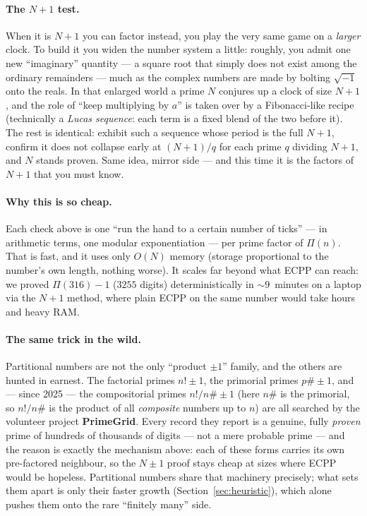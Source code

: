 \documentclass[11pt,a4paper]{article}
\newcommand{\Part}{\Pi}                 %
\begin{document}
\paragraph{The $N+1$ test.}
When it is $N+1$ you can factor instead, you play the very same game on a
\emph{larger} clock. To build it you widen the number system a little: roughly,
you admit one new ``imaginary'' quantity --- a square root that simply does not
exist among the ordinary remainders --- much as the complex numbers are made by
bolting $\sqrt{-1}$ onto the reals. In that enlarged world a prime $N$ conjures up
a clock of size $N+1$, and the role of ``keep multiplying by $a$'' is taken over
by a Fibonacci-like recipe (technically a \emph{Lucas sequence}: each term is a
fixed blend of the two before it). The rest is identical: exhibit such a sequence
whose period is the full $N+1$, confirm it does not collapse early at $(N+1)/q$
for each prime $q$ dividing $N+1$, and $N$ stands proven. Same idea, mirror side
--- and this time it is the factors of $N+1$ that you must know.

\paragraph{Why this is so cheap.}
Each check above is one ``run the hand to a certain number of ticks'' --- in
arithmetic terms, one modular exponentiation --- per prime factor of $\Part(n)$.
That is fast, and it uses only $O(N)$ memory (storage proportional to the
number's own length, nothing worse). It scales far beyond what ECPP can reach: we
proved $\Part(316)-1$ ($3255$ digits) deterministically in ${\sim}9$~minutes on a
laptop via the $N+1$ method, where plain ECPP on the same number would take hours
and heavy RAM.

\paragraph{The same trick in the wild.}
Partitional numbers are not the only ``product $\pm1$'' family, and the others are
hunted in earnest. The factorial primes $n!\pm1$, the primorial primes $p\#\pm1$,
and --- since 2025 --- the compositorial primes $n!/n\#\pm1$ (here $n\#$ is the
primorial, so $n!/n\#$ is the product of all \emph{composite} numbers up to $n$)
are all searched by the volunteer project \textbf{PrimeGrid}. Every record they
report is a genuine, fully \emph{proven} prime of hundreds of thousands of digits
--- not a mere probable prime --- and the reason is exactly the mechanism above:
each of these forms carries its own pre-factored neighbour, so the $N\pm1$ proof
stays cheap at sizes where ECPP would be hopeless. Partitional numbers share that
machinery precisely; what sets them apart is only their faster growth
(Section~\ref{sec:heuristic}), which alone pushes them onto the rare ``finitely
many'' side.
\end{document}
